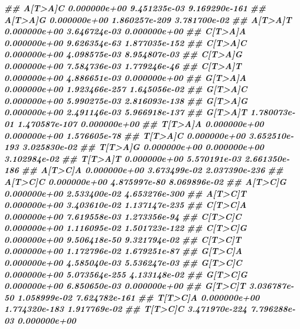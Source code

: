 \documentclass[
  12pt,
  a4paper,
  twoside]{book}
\newenvironment{Shaded}{\begin{snugshade}}{\end{snugshade}}
\newcommand{\DocumentationTok}[1]{\textcolor[rgb]{0.56,0.35,0.01}{\textbf{\textit{#1}}}}
\begin{document}
\begin{Shaded}
\begin{Highlighting}[]
\DocumentationTok{\#\# A[T\textgreater{}A]C  0.000000e+00  9.451235e{-}03 9.169290e{-}161}
\DocumentationTok{\#\# A[T\textgreater{}A]G  0.000000e+00 1.860257e{-}209  3.781700e{-}02}
\DocumentationTok{\#\# A[T\textgreater{}A]T  0.000000e+00  3.646724e{-}03  0.000000e+00}
\DocumentationTok{\#\# C[T\textgreater{}A]A  0.000000e+00  9.626354e{-}63 1.877035e{-}152}
\DocumentationTok{\#\# C[T\textgreater{}A]C  0.000000e+00  4.098575e{-}03  8.954807e{-}03}
\DocumentationTok{\#\# C[T\textgreater{}A]G  0.000000e+00  7.584736e{-}03  1.779246e{-}46}
\DocumentationTok{\#\# C[T\textgreater{}A]T  0.000000e+00  4.886651e{-}03  0.000000e+00}
\DocumentationTok{\#\# G[T\textgreater{}A]A  0.000000e+00 1.923466e{-}257  1.645056e{-}02}
\DocumentationTok{\#\# G[T\textgreater{}A]C  0.000000e+00  5.990275e{-}03 2.816093e{-}138}
\DocumentationTok{\#\# G[T\textgreater{}A]G  0.000000e+00  2.491146e{-}03 5.966918e{-}137}
\DocumentationTok{\#\# G[T\textgreater{}A]T  1.780073e{-}01 1.470587e{-}107  0.000000e+00}
\DocumentationTok{\#\# T[T\textgreater{}A]A  0.000000e+00  0.000000e+00  1.576605e{-}78}
\DocumentationTok{\#\# T[T\textgreater{}A]C  0.000000e+00 3.652510e{-}193  3.025830e{-}02}
\DocumentationTok{\#\# T[T\textgreater{}A]G  0.000000e+00  0.000000e+00  3.102984e{-}02}
\DocumentationTok{\#\# T[T\textgreater{}A]T  0.000000e+00  5.570191e{-}03 2.661350e{-}186}
\DocumentationTok{\#\# A[T\textgreater{}C]A  0.000000e+00  3.673499e{-}02 2.037390e{-}236}
\DocumentationTok{\#\# A[T\textgreater{}C]C  0.000000e+00  4.875997e{-}80  8.069896e{-}02}
\DocumentationTok{\#\# A[T\textgreater{}C]G  0.000000e+00  2.533400e{-}02 4.653276e{-}300}
\DocumentationTok{\#\# A[T\textgreater{}C]T  0.000000e+00  3.403610e{-}02 1.137147e{-}235}
\DocumentationTok{\#\# C[T\textgreater{}C]A  0.000000e+00  7.619558e{-}03  1.273356e{-}94}
\DocumentationTok{\#\# C[T\textgreater{}C]C  0.000000e+00  1.116095e{-}02 1.501723e{-}122}
\DocumentationTok{\#\# C[T\textgreater{}C]G  0.000000e+00  9.506418e{-}50  9.321794e{-}02}
\DocumentationTok{\#\# C[T\textgreater{}C]T  0.000000e+00  1.172796e{-}02  1.679251e{-}87}
\DocumentationTok{\#\# G[T\textgreater{}C]A  0.000000e+00  4.585040e{-}03  5.536247e{-}03}
\DocumentationTok{\#\# G[T\textgreater{}C]C  0.000000e+00 5.073564e{-}255  4.133148e{-}02}
\DocumentationTok{\#\# G[T\textgreater{}C]G  0.000000e+00  6.850650e{-}03  0.000000e+00}
\DocumentationTok{\#\# G[T\textgreater{}C]T  3.036787e{-}50  1.058999e{-}02 7.624782e{-}161}
\DocumentationTok{\#\# T[T\textgreater{}C]A  0.000000e+00 1.774320e{-}183  1.917769e{-}02}
\DocumentationTok{\#\# T[T\textgreater{}C]C 3.471970e{-}224  7.796288e{-}03  0.000000e+00}

\end{Highlighting}
\end{Shaded}
\end{document}
